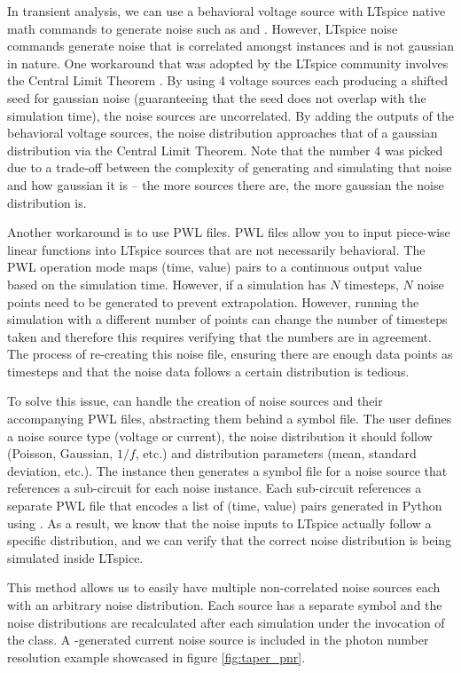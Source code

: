 In transient analysis, we can use a behavioral voltage source with LTspice native math commands
to generate noise such as  and . However, LTspice noise commands
generate noise that is correlated amongst instances and is not gaussian in nature. One workaround that was
adopted by the LTspice community involves the Central Limit Theorem \cite{CLM-ltspice}. By using 4 voltage sources each producing a shifted seed for 
gaussian noise (guaranteeing that the seed does not overlap with the simulation time),
the noise sources are uncorrelated. By adding the
outputs of the behavioral voltage sources, the noise distribution approaches that of
a gaussian distribution via the Central Limit Theorem. Note that the number 4 was picked due to a trade-off between the complexity of generating and simulating
that noise and how gaussian it is -- the more sources there are, the more gaussian the noise distribution is.

Another workaround is to use PWL files. PWL files allow you to input piece-wise linear functions into LTspice
sources that are not necessarily behavioral. The PWL operation mode maps (time, value) pairs to a continuous 
output value based on the simulation time. However, if a simulation has $N$ timesteps, $N$ noise points need to be generated to prevent extrapolation.
However, running the simulation with a different number of points can change the number
of timesteps taken and therefore this requires verifying that the numbers are in agreement.
The process of re-creating this noise file, ensuring there are enough data points as timesteps and that the noise data follows a certain distribution is tedious.

To solve this issue,  can handle the creation of noise sources and their accompanying PWL files,
abstracting them behind a symbol file. The user defines a noise source type (voltage or current), the 
noise distribution it should follow (Poisson, Gaussian, $1/f$, etc.) and distribution parameters (mean, 
standard deviation, etc.). The  instance then generates a symbol file for a noise source that 
references a sub-circuit for each noise instance. Each sub-circuit references a 
separate PWL file that encodes a list of (time, value) pairs generated in Python using
. As a result, we know that the noise inputs to LTspice actually follow a specific distribution, and we
can verify that the correct noise distribution is being simulated inside LTspice.

This method  allows us to easily have multiple non-correlated noise sources each with an 
arbitrary noise  distribution. Each source has a separate symbol and the noise 
distributions are recalculated after each simulation under the invocation of the 
class. A -generated current noise source is included in the photon number resolution 
example showcased in figure \ref{fig:taper_pnr}.

